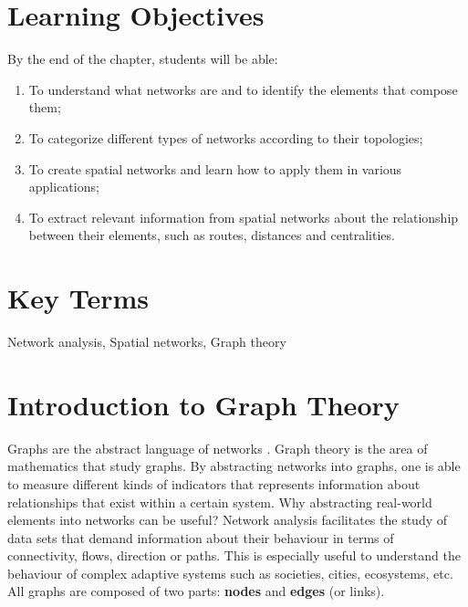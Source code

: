 \documentclass[
]{book}
\providecommand{\tightlist}{%
  \setlength{\itemsep}{0pt}\setlength{\parskip}{0pt}}
\begin{document}
\hypertarget{learning-objectives-7}{%
\section*{Learning Objectives}\label{learning-objectives-7}}

By the end of the chapter, students will be able:

\begin{enumerate}
\def\labelenumi{\arabic{enumi}.}
\tightlist
\item
  To understand what networks are and to identify the elements that compose them;
\item
  To categorize different types of networks according to their topologies;
\item
  To create spatial networks and learn how to apply them in various applications;
\item
  To extract relevant information from spatial networks about the relationship between their elements, such as routes, distances and centralities.
\end{enumerate}

\hypertarget{key-terms-7}{%
\section*{Key Terms}\label{key-terms-7}}

Network analysis, Spatial networks, Graph theory

\hypertarget{introduction-to-graph-theory}{%
\section{Introduction to Graph Theory}\label{introduction-to-graph-theory}}

Graphs are the abstract language of networks \citep{systemsinnovationGraphTheoryOverview2015}. Graph theory is the area of mathematics that study graphs. By abstracting networks into graphs, one is able to measure different kinds of indicators that represents information about relationships that exist within a certain system. Why abstracting real-world elements into networks can be useful? Network analysis facilitates the study of data sets that demand information about their behaviour in terms of connectivity, flows, direction or paths. This is especially useful to understand the behaviour of complex adaptive systems such as societies, cities, ecosystems, etc. All graphs are composed of two parts: \textbf{nodes} and \textbf{edges} (or links).
\end{document}

